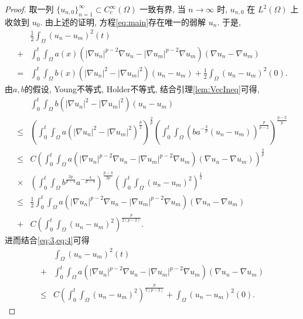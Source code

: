\documentclass[oneside,longtitle]{LZUthesis}
\numberwithin{equation}{chapter}
\newcommand*\abs[1]{\lvert#1\rvert}
\newcommand*\Brace[1]{\lbrace#1\rbrace}
\begin{document}
\begin{proof}
	取一列 $\Brace{u_{n, 0}}_{n=1}^{\infty} \subset C_c^{\infty}(\Omega)$ 一致有界,
	当 $n \to \infty $ 时, $u_{n, 0}$ 在 $L^2(\Omega)$ 上收敛到 $u_0$.
	由上述的证明, 方程\eqref{eq:main}存在唯一的弱解 $u_n$.
	于是,
	\begin{equation}\label{eq:3}
		\begin{split}
			& \frac{1}{2}\int_{\Omega}\left(u_n-u_m\right)^2(t)\\
			+{} & \int_{0}^{t}\int_{\Omega}a(x)
			\left(\abs{\nabla u_n}^{p-2}\nabla u_n
			- \abs{\nabla u_m}^{p-2}\nabla u_m\right)
			\left(\nabla u_n - \nabla u_m\right)\\
			={} & \int_{0}^{t}\int_{\Omega}b(x)\left(\abs{\nabla u_n}^2
			- \abs{\nabla u_m}^2\right)\left(u_n - u_m\right)
			+ \frac{1}{2}\int_{\Omega}\left(u_n-u_m\right)^2(0).
		\end{split}
	\end{equation}
	由$a, b$的假设, Young不等式, Holder不等式, 结合引理\ref{lem:VecIneq}可得,
	\begin{equation}\label{eq:4}
		\begin{split}
			& \int_{0}^{t}\int_{\Omega}b\left(\abs{\nabla u_n}^2
			- \abs{\nabla u_m}^2\right)\left(u_n - u_m\right)\\
			\leq{} & \left(\int_0^t\int_{\Omega}a\left(\abs{\nabla u_n}^2
			- \abs{\nabla u_m}^2\right)^{\frac{p}{2}}\right)^{\frac{2}{p}}
			\left(\int_0^t\int_{\Omega}\left(ba^{-\frac{2}{p}}
			\left(u_n-u_m\right)\right)^{\frac{p}{p-2}}\right)^{\frac{p-2}{p}}\\
			\leq{} & C\left(\int_0^t\int_{\Omega}a
			\left(\abs{\nabla u_n}^{p-2}\nabla u_n
			- \abs{\nabla u_m}^{p-2}\nabla u_m\right)
			\left(\nabla u_n - \nabla u_m\right)\right)^{\frac{2}{p}}\\
			\times{} & \left(\int_0^t\int_{\Omega}b^{\frac{2p}{p-4}}a^{-\frac{4}{p-4}}\right)^{\frac{p-4}{2p}}
			\left(\int_0^t\int_{\Omega}\left(u_n-u_m\right)^2\right)^{\frac{1}{2}}\\
			\leq{} & \frac{1}{2}\int_0^t\int_{\Omega}a
			\left(\abs{\nabla u_n}^{p-2}\nabla u_n
			- \abs{\nabla u_m}^{p-2}\nabla u_m\right)
			\left(\nabla u_n - \nabla u_m\right)\\
			+{} & C\left(\int_0^t\int_{\Omega}\left(u_n-u_m\right)^2\right)^{\frac{p}{2(p-2)}}.
		\end{split}
	\end{equation}
	进而结合\cref{eq:3,eq:4}可得
	\begin{equation}\label{un-umL2_0TW1p_bd_0TL2_L20}
		\begin{split}
			& \int_{\Omega}\left(u_n-u_m\right)^2(t)\\
			+{} & \int_{0}^{t}\int_{\Omega}a
			\left(\abs{\nabla u_n}^{p-2}\nabla u_n
			- \abs{\nabla u_m}^{p-2}\nabla u_m\right)
			\left(\nabla u_n - \nabla u_m\right)\\
			\leq{} & C\left(\int_0^t\int_{\Omega}
			\left(u_n-u_m\right)^2\right)^{\frac{p}{2(p-2)}}
			+ \int_{\Omega}\left(u_n-u_m\right)^2(0).
		\end{split}
	\end{equation}


\end{proof}
\end{document}

